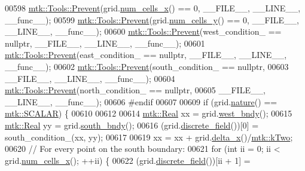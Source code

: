 \begin{DoxyCode}
00598   \hyperlink{classmtk_1_1Tools_a332324c6f25e66be9dff48c5987a3b9f}{mtk::Tools::Prevent}(grid.\hyperlink{classmtk_1_1UniStgGrid2D_a2d182866a398aba8e4829590e85bf939}{num\_cells\_x}() == 0, \_\_FILE\_\_, \_\_LINE\_\_, \_\_func\_\_);
00599   \hyperlink{classmtk_1_1Tools_a332324c6f25e66be9dff48c5987a3b9f}{mtk::Tools::Prevent}(grid.\hyperlink{classmtk_1_1UniStgGrid2D_aed05a801cc9a76dba0ff203cea58a61a}{num\_cells\_y}() == 0, \_\_FILE\_\_, \_\_LINE\_\_, \_\_func\_\_);
00600   \hyperlink{classmtk_1_1Tools_a332324c6f25e66be9dff48c5987a3b9f}{mtk::Tools::Prevent}(west\_condition\_ == \textcolor{keyword}{nullptr}, \_\_FILE\_\_, \_\_LINE\_\_, \_\_func\_\_);
00601   \hyperlink{classmtk_1_1Tools_a332324c6f25e66be9dff48c5987a3b9f}{mtk::Tools::Prevent}(east\_condition\_ == \textcolor{keyword}{nullptr}, \_\_FILE\_\_, \_\_LINE\_\_, \_\_func\_\_);
00602   \hyperlink{classmtk_1_1Tools_a332324c6f25e66be9dff48c5987a3b9f}{mtk::Tools::Prevent}(south\_condition\_ == \textcolor{keyword}{nullptr},
00603                       \_\_FILE\_\_, \_\_LINE\_\_, \_\_func\_\_);
00604   \hyperlink{classmtk_1_1Tools_a332324c6f25e66be9dff48c5987a3b9f}{mtk::Tools::Prevent}(north\_condition\_ == \textcolor{keyword}{nullptr},
00605                       \_\_FILE\_\_, \_\_LINE\_\_, \_\_func\_\_);
00606 \textcolor{preprocessor}{  #endif}
00607 
00609   \textcolor{keywordflow}{if} (grid.\hyperlink{classmtk_1_1UniStgGrid2D_a99a3a9cdb05b7306be99bde935509e30}{nature}() == \hyperlink{namespacemtk_ga4c54f2a329cfb4e56213b02a259d19e2af481d45bd70d41381c7d72e200889205}{mtk::SCALAR}) \{
00610 
00612 
00614     \hyperlink{group__c01-roots_gac080bbbf5cbb5502c9f00405f894857d}{mtk::Real} xx = grid.\hyperlink{classmtk_1_1UniStgGrid2D_af2b1712387ded85edaf2b64617d3fc13}{west\_bndy}();
00615     \hyperlink{group__c01-roots_gac080bbbf5cbb5502c9f00405f894857d}{mtk::Real} yy = grid.\hyperlink{classmtk_1_1UniStgGrid2D_a1442eaf219f099d0ebf46a170fdebf92}{south\_bndy}();
00616     (grid.\hyperlink{classmtk_1_1UniStgGrid2D_a3e72d59843a3f9c5e47da07e5850dfe0}{discrete\_field}())[0] = south\_condition\_(xx, yy);
00617 
00619     xx = xx + grid.\hyperlink{classmtk_1_1UniStgGrid2D_aca4710004c4a7da6a9e8fd6ab32a691f}{delta\_x}()/\hyperlink{group__c01-roots_gaf39c2d851a2db744f4feb1c5ab3ec2cf}{mtk::kTwo};
00620     \textcolor{comment}{// For every point on the south boundary:}
00621     \textcolor{keywordflow}{for} (\textcolor{keywordtype}{int} ii = 0; ii < grid.\hyperlink{classmtk_1_1UniStgGrid2D_a2d182866a398aba8e4829590e85bf939}{num\_cells\_x}(); ++ii) \{
00622       (grid.\hyperlink{classmtk_1_1UniStgGrid2D_a3e72d59843a3f9c5e47da07e5850dfe0}{discrete\_field}())[ii + 1] =

\end{DoxyCode}
